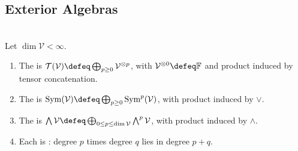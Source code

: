 \subsection{Exterior Algebras}

\begin{definition} \label{def:graded-tensor-symmetric-exterior-algebras} \\
Let $\dim\mathcal{V}<\infty$.
\begin{enumerate}[label=(\roman*)]
\setlength{\itemsep}{0pt}
\item The  is $\mathcal{T}(\mathcal{V})\defeq\bigoplus_{p\geq0}\mathcal{V}^{\otimes p}$, with $\mathcal{V}^{\otimes0}\defeq\mathbb{F}$ and product induced by tensor concatenation.
\item The  is $\operatorname{Sym}(\mathcal{V})\defeq\bigoplus_{p\geq0}\operatorname{Sym}^{p}(\mathcal{V})$, with product induced by $\vee$.
\item The  is $\bigwedge\mathcal{V}\defeq\bigoplus_{0\leq p\leq\dim\mathcal{V}}\bigwedge^{p}\mathcal{V}$, with product induced by $\wedge$.
\item Each is : degree $p$ times degree $q$ lies in degree $p+q$.
\end{enumerate}
\end{definition}

